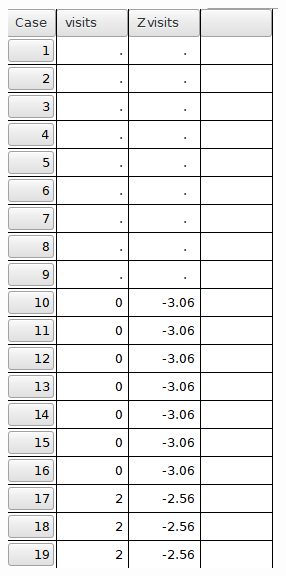 \begin{figure}[H]%
  \centering
  \parbox{.45\linewidth}{
    \includegraphics[width=\linewidth]{gfx/lab05_fig05}
  }%
  \qquad

\end{figure}
